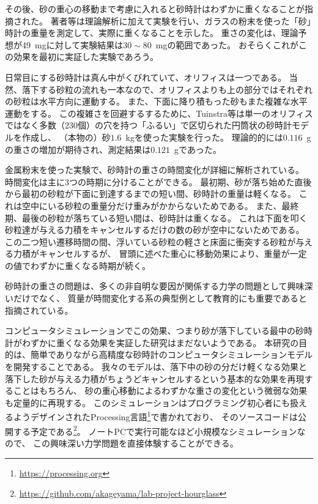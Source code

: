 \documentclass[dvipdfmx]{article}
\begin{document}
その後、砂の重心の移動まで考慮に入れると砂時計はわずかに重くなることが指摘された\cite{ShenUnknown-pk}。
著者等は理論解析に加えて実験を行い、ガラスの粉末を使った「砂」時計の重量を測定して、実際に重くなることを示した。
重さの変化は、理論予想が49~\si{mg}に対して実験結果は$30\sim 80$~\si{mg}の範囲であった。
おそらくこれがこの効果を最初に実証した実験であろう。


日常目にする砂時計は真ん中がくびれていて、オリフィスは一つである。
当然、落下する砂粒の流れも一本なので、オリフィスよりも上の部分ではそれぞれの砂粒は水平方向に運動する。
また、下面に降り積もった砂もまた複雑な水平運動をする。
この複雑さを回避するするために、Tuinstra等は単一のオリフィスではなく多数（230個）の穴を持つ「ふるい」で区切られた円筒状の砂時計モデルを作成し、
（本物の）砂$1.6$~\si{kg}を使った実験を行った\cite{Tuinstra2010-wk}。
理論的的には$0.116$~\si{g}の重さの増加が期待され、測定結果は$0.121$~\si{g}であった。


金属粉末を使った実験で、砂時計の重さの時間変化が詳細に解析されている\cite{Sack2017-rq}。
時間変化は主に3つの時期に分けることができる。
最初期、砂が落ち始めた直後から最初の砂粒が下面に到達するまでの短い間、砂時計の重量は軽くなる。
これは空中にいる砂粒の重量分だけ重みがかからないためである。
また、最終期、最後の砂粒が落ちている短い間は、砂時計は重くなる。
これは下面を叩く砂粒達が与える力積をキャンセルするだけの数の砂が空中にないためである。
この二つ短い遷移時間の間、浮いている砂粒の軽さと床面に衝突する砂粒が与える力積がキャンセルするが、
冒頭に述べた重心に移動効果により、重量が一定の値でわずかに重くなる時期が続く。


砂時計の重さの問題は、多くの非自明な要因が関係する力学の問題として興味深いだけでなく、
質量が時間変化する系の典型例として教育的にも重要であると指摘されている\cite{Kassandrov2023-tn}。


コンピュータシミュレーションでこの効果、つまり砂が落下している最中の砂時計がわずかに重くなる効果を実証した研究はまだないようである。
本研究の目的は、簡単でありながら高精度な砂時計のコンピュータシミュレーションモデルを開発することである。
我々のモデルは、落下中の砂の分だけ軽くなる効果と落下した砂が与える力積がちょうどキャンセルするという基本的な効果を再現することはもちろん、
砂の重心移動によるわずかな重さの変化という微弱な効果も定量的に再現する。
このシミュレーションはプログラミング初心者にも扱えるようデザインされたProcessing言語\footnote{\url{https://processing.org}}で書かれており、
そのソースコードは公開する予定である\footnote{\url{https://github.com/akageyama/lab-project-hourglass}}。
ノートPCで実行可能なほど小規模なシミュレーションなので、
この興味深い力学問題を直接体験することができる。
\end{document}
